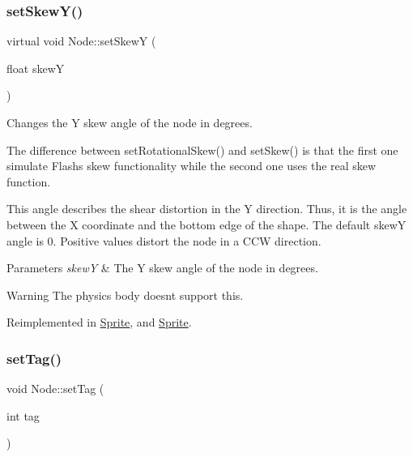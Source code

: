 \mbox{\label{classNode_aa785fa12d35c571bac718f7b025cc684}} 
\subsubsection{\texorpdfstring{set\+Skew\+Y()}{setSkewY()}\hspace{0.1cm}{\footnotesize\ttfamily [2/2]}}
{\footnotesize\ttfamily virtual void Node\+::set\+SkewY (\begin{DoxyParamCaption}\item[{float}]{skewY }\end{DoxyParamCaption})\hspace{0.3cm}{\ttfamily [virtual]}}

Changes the Y skew angle of the node in degrees.

The difference between {\ttfamily set\+Rotational\+Skew()} and {\ttfamily set\+Skew()} is that the first one simulate Flash\textquotesingle{}s skew functionality while the second one uses the real skew function.

This angle describes the shear distortion in the Y direction. Thus, it is the angle between the X coordinate and the bottom edge of the shape. The default skewY angle is 0. Positive values distort the node in a C\+CW direction.


\begin{DoxyParams}{Parameters}
{\em skewY} & The Y skew angle of the node in degrees.\\
\hline
\end{DoxyParams}
\begin{DoxyWarning}{Warning}
The physics body doesn\textquotesingle{}t support this. 
\end{DoxyWarning}


Reimplemented in \hyperlink{classSprite_a5472345454102a7682c929b974573879}{Sprite}, and \hyperlink{classSprite_ab1d4bdeffe2b1fa8720481316123316a}{Sprite}.

\mbox{\label{classNode_a41ecfc5e9e398e70dfe2e158f926c16f}} 
\subsubsection{\texorpdfstring{set\+Tag()}{setTag()}\hspace{0.1cm}{\footnotesize\ttfamily [1/2]}}
{\footnotesize\ttfamily void Node\+::set\+Tag (\begin{DoxyParamCaption}\item[{int}]{tag }\end{DoxyParamCaption})\hspace{0.3cm}{\ttfamily [virtual]}}



